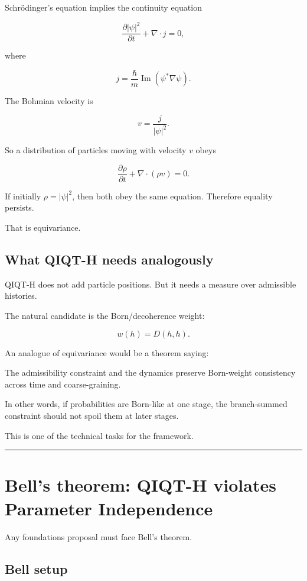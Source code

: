 \documentclass[11pt,a4paper]{article}
\newenvironment{qiqtquote}{\begin{mdframed}[style=quotestyle]}{\end{mdframed}}
\begin{document}
Schrödinger’s equation implies the continuity equation

\[
\frac{\partial |\psi|^2}{\partial t}
+
\nabla\cdot j=0,
\]

where

\[
j=\frac{\hbar}{m}\operatorname{Im}(\psi^*\nabla\psi).
\]

The Bohmian velocity is

\[
v=\frac{j}{|\psi|^2}.
\]

So a distribution of particles moving with velocity $v$ obeys

\[
\frac{\partial \rho}{\partial t}
+
\nabla\cdot(\rho v)=0.
\]

If initially $\rho=|\psi|^2$, then both obey the same equation. Therefore equality persists.

That is equivariance.

\subsection{What QIQT-H needs analogously}

QIQT-H does not add particle positions. But it needs a measure over admissible histories.

The natural candidate is the Born/decoherence weight:

\[
w(h)=D(h,h).
\]

An analogue of equivariance would be a theorem saying:

\begin{qiqtquote}
The admissibility constraint and the dynamics preserve Born-weight consistency across time and coarse-graining.
\end{qiqtquote}

In other words, if probabilities are Born-like at one stage, the branch-summed constraint should not spoil them at later stages.

This is one of the technical tasks for the framework.

\medskip\hrule\medskip

\section{Bell’s theorem: QIQT-H violates Parameter Independence}

Any foundations proposal must face Bell’s theorem.

\subsection{Bell setup}
\end{document}
